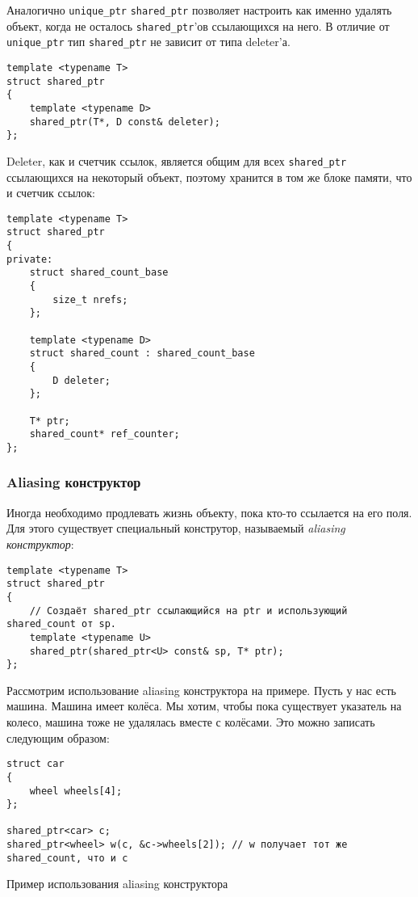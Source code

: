 Аналогично \texttt{unique_ptr} \texttt{shared_ptr} позволяет настроить как именно удалять объект, когда не осталось \texttt{shared_ptr}'ов ссылающихся на него. В отличие от \texttt{unique_ptr} тип \texttt{shared_ptr} не зависит от типа deleter'а.

\begin{verbatim}
template <typename T>
struct shared_ptr
{
    template <typename D>
    shared_ptr(T*, D const& deleter);
};
\end{verbatim}

Deleter, как и счетчик ссылок, является общим для всех \texttt{shared_ptr} ссылающихся на некоторый объект, поэтому хранится в том же блоке памяти, что и счетчик ссылок:

\begin{verbatim}
template <typename T>
struct shared_ptr
{
private:
    struct shared_count_base
    {
        size_t nrefs;
    };

    template <typename D>
    struct shared_count : shared_count_base
    {
        D deleter;
    };

    T* ptr;
    shared_count* ref_counter;
};
\end{verbatim}

\subsubsection{Aliasing конструктор}
\label{aliasing_constructor}
Иногда необходимо продлевать жизнь объекту, пока кто-то ссылается на его поля. Для этого существует специальный конструтор, называемый {\it aliasing конструктор}:

\begin{verbatim}
template <typename T>
struct shared_ptr
{
    // Создаёт shared_ptr ссылающийся на ptr и использующий shared_count от sp.
    template <typename U>
    shared_ptr(shared_ptr<U> const& sp, T* ptr);
};
\end{verbatim}

Рассмотрим использование aliasing конструктора на примере. Пусть у нас есть машина. Машина имеет колёса. Мы хотим, чтобы пока существует указатель на колесо, машина тоже не удалялась вместе с колёсами. Это можно записать следующим образом:

\begin{listing}
\begin{verbatim}
struct car
{
    wheel wheels[4];
};

shared_ptr<car> c;
shared_ptr<wheel> w(c, &c->wheels[2]); // w получает тот же shared_count, что и c
\end{verbatim}
\caption{Пример использования aliasing конструктора}
\label{listing:shared_ptr_aliasing_ctor_example}
\end{listing}

